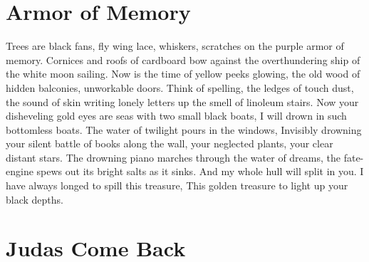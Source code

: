 \documentclass[english,11pt,letterpaper,onecolumn]{scrbook}
\begin{document}
\newpage
\section{Armor of Memory}

\begin{poem}
\begin{stanza}
Trees are black fans, fly wing lace, whiskers, scratches on the purple armor of memory. \verseline
Cornices and roofs of cardboard bow against the overthundering ship of the white moon sailing. \verseline
Now is the time of yellow peeks glowing, the old wood of hidden balconies, unworkable doors. \verseline
Think of spelling, the ledges of touch dust, the sound of skin writing lonely letters up the smell of linoleum stairs. \verseline
Now your disheveling gold eyes are seas with two small black boats, I will drown in such bottomless boats. \verseline
The water of twilight pours in the windows, \verseline
Invisibly drowning your silent battle of books along the wall, your neglected plants, your clear distant stars. \verseline
The drowning piano marches through the water of dreams, the fate-engine spews out its bright salts as it sinks. \verseline
And my whole hull will split in you.  I have always longed to spill this treasure, \verseline
This golden treasure to light up your black depths.
\end{stanza}
\end{poem}

\newpage
\section{Judas Come Back}
\end{document}
